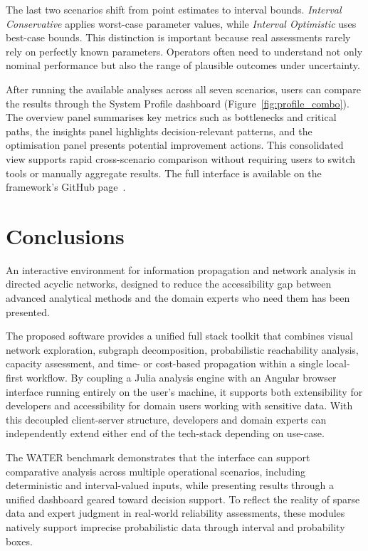 \documentclass[twocolumn]{rps-esrel2026}
\begin{document}
The last two scenarios shift from point estimates to interval bounds. \textit{Interval Conservative} applies worst-case parameter values, while \textit{Interval Optimistic} uses best-case bounds. This distinction is important because real assessments rarely rely on perfectly known parameters. Operators often need to understand not only nominal performance but also the range of plausible outcomes under uncertainty.

After running the available analyses across all seven scenarios, users can compare the results through the System Profile dashboard (Figure~\ref{fig:profile_combo}). The overview panel summarises key metrics such as bottlenecks and critical paths, the insights panel highlights decision-relevant patterns, and the optimisation panel presents potential improvement actions. This consolidated view supports rapid cross-scenario comparison without requiring users to switch tools or manually aggregate results. The full interface is available on the framework's GitHub page~\cite{infoprop2026_julia}.



\section{Conclusions}\label{sec:conclusions}
An interactive environment for information propagation and network analysis in directed acyclic networks, designed to reduce the accessibility gap between advanced analytical methods and the domain experts who need them has been presented.

The proposed software provides a unified full stack toolkit that combines visual network exploration, subgraph decomposition, probabilistic reachability analysis, capacity assessment, and time- or cost-based propagation within a single local-first workflow. By coupling a Julia analysis engine with an Angular browser interface running entirely on the user’s machine, it supports both extensibility for developers and accessibility for domain users working with sensitive data. With this decoupled client-server structure, developers and domain experts can independently extend either end of the tech-stack depending on use-case. 

The WATER benchmark demonstrates that the interface can support comparative analysis across multiple operational scenarios, including deterministic and interval-valued inputs, while presenting results through a unified dashboard geared toward decision support.  To reflect the reality of sparse data and expert judgment in real-world reliability assessments, these modules natively support  imprecise probabilistic data through interval and probability boxes. 
\end{document}
